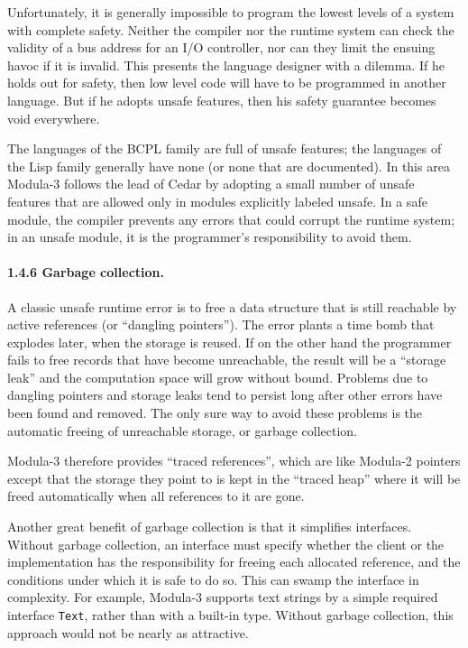 \documentclass[10pt]{article}
\begin{document}
Unfortunately, it is generally impossible to program the lowest levels of a
system with complete safety.  Neither the compiler nor the runtime system can
check the validity of a bus address for an I/O controller, nor can they limit
the ensuing havoc if it is invalid.  This presents the language designer with
a dilemma.  If he holds out for safety, then low level code will have to be
programmed in another language.  But if he adopts unsafe features, then his
safety guarantee becomes void everywhere.

The languages of the BCPL family are full of unsafe features; the languages of
the Lisp family generally have none (or none that are documented).  In this
area Modula-3 follows the lead of Cedar by adopting a small number of unsafe
features that are allowed only in modules explicitly labeled unsafe.  In a
safe module, the compiler prevents any errors that could corrupt the runtime
system; in an unsafe module, it is the programmer's responsibility to avoid
them.

\paragraph{1.4.6 Garbage collection.}

A classic unsafe runtime error is to free a data structure that is still
reachable by active references (or ``dangling pointers'').  The error plants a
time bomb that explodes later, when the storage is reused.  If on the other
hand the programmer fails to free records that have become unreachable, the
result will be a ``storage leak'' and the computation space will grow without
bound.  Problems due to dangling pointers and storage leaks tend to persist
long after other errors have been found and removed.  The only sure way to
avoid these problems is the automatic freeing of unreachable storage, or
garbage collection.

Modula-3 therefore provides ``traced references'', which are like Modula-2
pointers except that the storage they point to is kept in the ``traced heap''
where it will be freed automatically when all references to it are gone.

Another great benefit of garbage collection is that it simplifies interfaces.
Without garbage collection, an interface must specify whether the client or
the implementation has the responsibility for freeing each allocated
reference, and the conditions under which it is safe to do so.  This can swamp
the interface in complexity.  For example, Modula-3 supports text strings by a
simple required interface \verb|Text|, rather than with a built-in type.
Without garbage collection, this approach would not be nearly as attractive.
\end{document}

